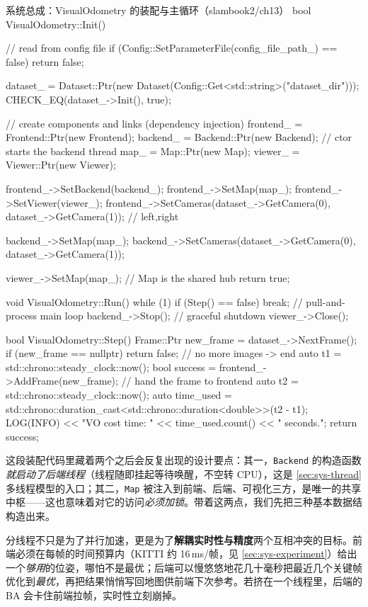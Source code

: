 \begin{codebox}[C++]{系统总成：VisualOdometry 的装配与主循环（slambook2/ch13）}
bool VisualOdometry::Init() {
    // read from config file
    if (Config::SetParameterFile(config_file_path_) == false) return false;

    dataset_ = Dataset::Ptr(new Dataset(Config::Get<std::string>("dataset_dir")));
    CHECK_EQ(dataset_->Init(), true);

    // create components and links (dependency injection)
    frontend_ = Frontend::Ptr(new Frontend);
    backend_  = Backend::Ptr(new Backend);     // ctor starts the backend thread
    map_      = Map::Ptr(new Map);
    viewer_   = Viewer::Ptr(new Viewer);

    frontend_->SetBackend(backend_);
    frontend_->SetMap(map_);
    frontend_->SetViewer(viewer_);
    frontend_->SetCameras(dataset_->GetCamera(0), dataset_->GetCamera(1)); // left,right

    backend_->SetMap(map_);
    backend_->SetCameras(dataset_->GetCamera(0), dataset_->GetCamera(1));

    viewer_->SetMap(map_);                      // Map is the shared hub
    return true;
}

void VisualOdometry::Run() {
    while (1) { if (Step() == false) break; }   // pull-and-process main loop
    backend_->Stop();                           // graceful shutdown
    viewer_->Close();
}

bool VisualOdometry::Step() {
    Frame::Ptr new_frame = dataset_->NextFrame();
    if (new_frame == nullptr) return false;     // no more images -> end
    auto t1 = std::chrono::steady_clock::now();
    bool success = frontend_->AddFrame(new_frame);  // hand the frame to frontend
    auto t2 = std::chrono::steady_clock::now();
    auto time_used =
        std::chrono::duration_cast<std::chrono::duration<double>>(t2 - t1);
    LOG(INFO) << "VO cost time: " << time_used.count() << " seconds.";
    return success;
}
\end{codebox}

\noindent 这段装配代码里藏着两个之后会反复出现的设计要点：其一，\texttt{Backend} 的构造函数\emph{就启动了后端线程}（线程随即挂起等待唤醒，不空转 CPU），这是 \cref{sec:sys-thread} 多线程模型的入口；其二，\texttt{Map} 被注入到前端、后端、可视化三方，是唯一的共享中枢——这也意味着对它的访问\emph{必须加锁}。带着这两点，我们先把三种基本数据结构造出来。

\begin{pitfall}
分线程不只是为了并行加速，更是为了\textbf{解耦实时性与精度}两个互相冲突的目标。前端必须在每帧的时间预算内（KITTI 约 16\,ms/帧，见 \cref{sec:sys-experiment}）给出一个\emph{够用}的位姿，哪怕不是最优；后端可以慢悠悠地花几十毫秒把最近几个关键帧优化到\emph{最优}，再把结果悄悄写回地图供前端下次参考。若挤在一个线程里，后端的 BA 会卡住前端拉帧，实时性立刻崩掉。
\end{pitfall}

